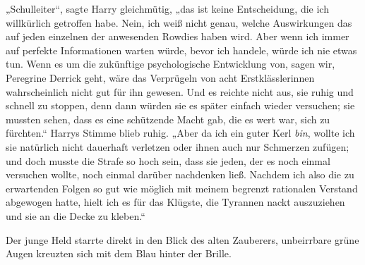 „Schulleiter“, sagte Harry gleichmütig, „das ist keine Entscheidung, die ich willkürlich getroffen habe. Nein, ich weiß nicht genau, welche Auswirkungen das auf jeden einzelnen der anwesenden Rowdies haben wird. Aber wenn ich immer auf perfekte Informationen warten würde, bevor ich handele, würde ich nie etwas tun. Wenn es um die zukünftige psychologische Entwicklung von, sagen wir, Peregrine Derrick geht, wäre das Verprügeln von acht Erstklässlerinnen wahrscheinlich nicht gut für ihn gewesen. Und es reichte nicht aus, sie ruhig und schnell zu stoppen, denn dann würden sie es später einfach wieder versuchen; sie mussten sehen, dass es eine schützende Macht gab, die es wert war, sich zu fürchten.“ Harrys Stimme blieb ruhig. „Aber da ich ein guter Kerl \emph{bin}, wollte ich sie natürlich nicht dauerhaft verletzen oder ihnen auch nur Schmerzen zufügen; und doch musste die Strafe so hoch sein, dass sie jeden, der es noch einmal versuchen wollte, noch einmal darüber nachdenken ließ. Nachdem ich also die zu erwartenden Folgen so gut wie möglich mit meinem begrenzt rationalen Verstand abgewogen hatte, hielt ich es für das Klügste, die Tyrannen nackt auszuziehen und sie an die Decke zu kleben.“

Der junge Held starrte direkt in den Blick des alten Zauberers, unbeirrbare grüne Augen kreuzten sich mit dem Blau hinter der Brille.

